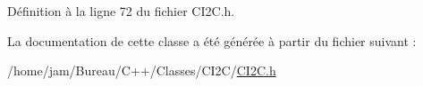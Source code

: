 Définition à la ligne 72 du fichier C\+I2\+C.\+h.



La documentation de cette classe a été générée à partir du fichier suivant \+:\begin{DoxyCompactItemize}
\item 
/home/jam/\+Bureau/\+C++/\+Classes/\+C\+I2\+C/\hyperlink{_c_i2_c_8h}{C\+I2\+C.\+h}\end{DoxyCompactItemize}
